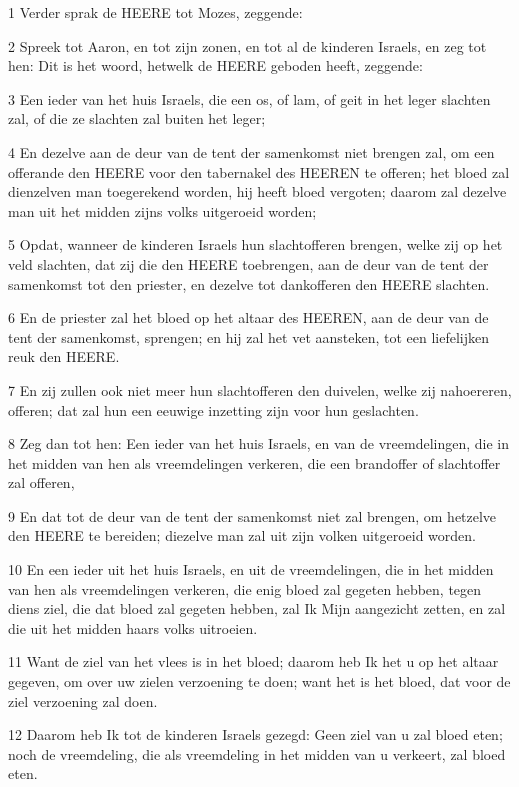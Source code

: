 \par 1 Verder sprak de HEERE tot Mozes, zeggende:
\par 2 Spreek tot Aaron, en tot zijn zonen, en tot al de kinderen Israels, en zeg tot hen: Dit is het woord, hetwelk de HEERE geboden heeft, zeggende:
\par 3 Een ieder van het huis Israels, die een os, of lam, of geit in het leger slachten zal, of die ze slachten zal buiten het leger;
\par 4 En dezelve aan de deur van de tent der samenkomst niet brengen zal, om een offerande den HEERE voor den tabernakel des HEEREN te offeren; het bloed zal dienzelven man toegerekend worden, hij heeft bloed vergoten; daarom zal dezelve man uit het midden zijns volks uitgeroeid worden;
\par 5 Opdat, wanneer de kinderen Israels hun slachtofferen brengen, welke zij op het veld slachten, dat zij die den HEERE toebrengen, aan de deur van de tent der samenkomst tot den priester, en dezelve tot dankofferen den HEERE slachten.
\par 6 En de priester zal het bloed op het altaar des HEEREN, aan de deur van de tent der samenkomst, sprengen; en hij zal het vet aansteken, tot een liefelijken reuk den HEERE.
\par 7 En zij zullen ook niet meer hun slachtofferen den duivelen, welke zij nahoereren, offeren; dat zal hun een eeuwige inzetting zijn voor hun geslachten.
\par 8 Zeg dan tot hen: Een ieder van het huis Israels, en van de vreemdelingen, die in het midden van hen als vreemdelingen verkeren, die een brandoffer of slachtoffer zal offeren,
\par 9 En dat tot de deur van de tent der samenkomst niet zal brengen, om hetzelve den HEERE te bereiden; diezelve man zal uit zijn volken uitgeroeid worden.
\par 10 En een ieder uit het huis Israels, en uit de vreemdelingen, die in het midden van hen als vreemdelingen verkeren, die enig bloed zal gegeten hebben, tegen diens ziel, die dat bloed zal gegeten hebben, zal Ik Mijn aangezicht zetten, en zal die uit het midden haars volks uitroeien.
\par 11 Want de ziel van het vlees is in het bloed; daarom heb Ik het u op het altaar gegeven, om over uw zielen verzoening te doen; want het is het bloed, dat voor de ziel verzoening zal doen.
\par 12 Daarom heb Ik tot de kinderen Israels gezegd: Geen ziel van u zal bloed eten; noch de vreemdeling, die als vreemdeling in het midden van u verkeert, zal bloed eten.
